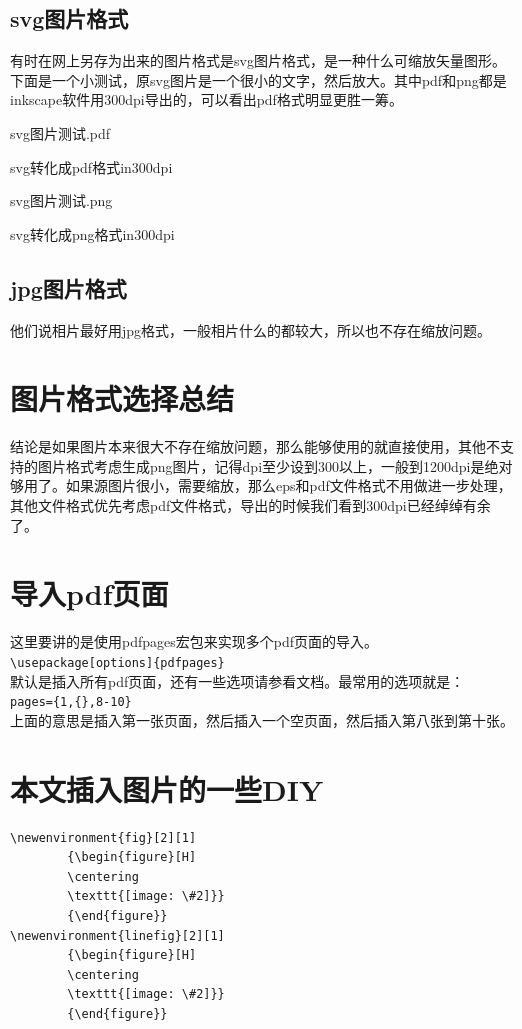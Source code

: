 \documentclass[11pt,oneside]{book}
\begin{document}
\subsection{svg图片格式}
有时在网上另存为出来的图片格式是svg图片格式，是一种什么可缩放矢量图形。下面是一个小测试，原svg图片是一个很小的文字，然后放大。其中pdf和png都是inkscape软件用300dpi导出的，可以看出pdf格式明显更胜一筹。
\begin{multicols}{2}
\begin{linefig}{svg图片测试.pdf}
\label{fig:svg图片测试.pdf}
\caption*{\footnotesize svg转化成pdf格式in300dpi}
\end{linefig}
\begin{linefig}{svg图片测试.png}
\label{fig:svg图片测试.png}
\caption*{\footnotesize svg转化成png格式in300dpi}
\end{linefig}
\end{multicols}

\subsection{jpg图片格式}
他们说相片最好用jpg格式，一般相片什么的都较大，所以也不存在缩放问题。

\section{图片格式选择总结}
结论是如果图片本来很大不存在缩放问题，那么能够使用的就直接使用，其他不支持的图片格式考虑生成png图片，记得dpi至少设到300以上，一般到1200dpi是绝对够用了。如果源图片很小，需要缩放，那么eps和pdf文件格式不用做进一步处理，其他文件格式优先考虑pdf文件格式，导出的时候我们看到300dpi已经绰绰有余了。

\section{导入pdf页面}
这里要讲的是使用pdfpages宏包来实现多个pdf页面的导入。\\
\verb+\usepackage[options]{pdfpages} +\\
默认是插入所有pdf页面，还有一些选项请参看文档。最常用的选项就是：\\
\verb+pages={1,{},8-10}+\\
上面的意思是插入第一张页面，然后插入一个空页面，然后插入第八张到第十张。

\section{本文插入图片的一些DIY}
\begin{Verbatim}
\newenvironment{fig}[2][1]
        {\begin{figure}[H]
        \centering
        \texttt{[image: \#2]}}
        {\end{figure}}
\newenvironment{linefig}[2][1]
        {\begin{figure}[H]
        \centering
        \texttt{[image: \#2]}}
        {\end{figure}}
\end{Verbatim}
\end{document}

